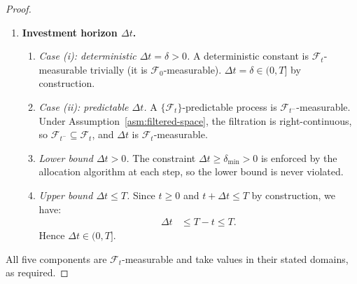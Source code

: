 \documentclass[12pt,openany]{book}
\newcommand{\calF}{\mathcal{F}}
\numberwithin{equation}{chapter}
\theoremstyle{plain}
\theoremstyle{definition}
\theoremstyle{remark}
\numberwithin{equation}{chapter}
\theoremstyle{plain}
\begin{document}
\begin{proof}
\begin{enumerate}
\begin{enumerate}
      \item \emph{Càdlàg modification in illiquid regimes.}
        In illiquid periods, the last-observed-value convention
        defines $IV_t := IV_{\tau^-}$ where
        $\tau = \sup\{s \leq t : \text{quote available}\}$.
        Under Assumption~\ref{asm:filtered-space}, the filtration
        satisfies the usual conditions, guaranteeing the existence
        of a càdlàg modification of any adapted process
        (Theorem~I.1.3 in Protter~\cite{Protter2005}).
        The stopping time $\tau$ is $\calF_t$-measurable, and
        $IV_{\tau^-}$ is $\calF_{\tau^-} \subseteq \calF_t$-measurable.

      \item \emph{Measurability of $\mathrm{skew}_t$
        and $\mathrm{term}_t$.}
        Both are arithmetic combinations of implied volatilities
        at different strikes and maturities, each of which is
        $\calF_t$-measurable by the preceding steps.
        Arithmetic operations preserve $\calF_t$-measurability.
    \end{enumerate}

  \item \textbf{Investment horizon $\Delta t$.}

    \begin{enumerate}
      \item \emph{Case (i): deterministic $\Delta t = \delta > 0$.}
        A deterministic constant is
        $\calF_t$-measurable trivially (it is
        $\calF_0$-measurable).
        $\Delta t = \delta \in (0, T]$ by construction.

      \item \emph{Case (ii): predictable $\Delta t$.}
        A $\{\calF_t\}$-predictable process is
        $\calF_{t^-}$-measurable.
        Under Assumption~\ref{asm:filtered-space}, the filtration
        is right-continuous, so $\calF_{t^-} \subseteq \calF_t$,
        and $\Delta t$ is $\calF_t$-measurable.

      \item \emph{Lower bound $\Delta t > 0$.}
        The constraint $\Delta t \geq \delta_{\min} > 0$ is
        enforced by the allocation algorithm at each step,
        so the lower bound is never violated.

      \item \emph{Upper bound $\Delta t \leq T$.}
        Since $t \geq 0$ and $t + \Delta t \leq T$ by
        construction, we have:
        \begin{align}
          \Delta t
            &\leq T - t
             \leq T.
        \end{align}
        Hence $\Delta t \in (0, T]$.
    \end{enumerate}

\end{enumerate}

\noindent
All five components are $\calF_t$-measurable and take values in
their stated domains, as required.
\end{proof}
\end{document}
